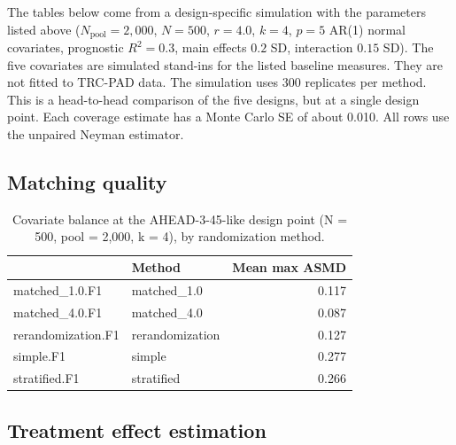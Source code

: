 \documentclass[
  11pt,
]{article}
\begin{document}
The tables below come from a design-specific simulation
with the parameters listed above (\(N_{\text{pool}} =
2{,}000\), \(N = 500\), \(r = 4.0\), \(k = 4\), \(p = 5\) AR(1)
normal covariates, prognostic \(R^2 = 0.3\), main effects
\(0.2\) SD, interaction \(0.15\) SD). The five covariates are
simulated stand-ins for the listed baseline measures. They
are not fitted to TRC-PAD data. The simulation uses
300 replicates per method. This is a head-to-head
comparison of the five designs, but at a single design
point. Each coverage estimate has a Monte Carlo SE of about
0.010. All rows use the unpaired Neyman
estimator.

\subsection{Matching quality}\label{matching-quality}

\begin{table}[!h]
\centering
\caption{\label{tab:application-balance}Covariate balance at the AHEAD-3-45-like design point (N = 500, pool = 2,000, k = 4), by randomization method.}
\centering
\fontsize{10}{12}\selectfont
\begin{tabular}[t]{llr}
\toprule
  & Method & Mean max ASMD\\
\midrule
matched\_1.0.F1 & matched\_1.0 & 0.117\\
matched\_4.0.F1 & matched\_4.0 & 0.087\\
rerandomization.F1 & rerandomization & 0.127\\
simple.F1 & simple & 0.277\\
stratified.F1 & stratified & 0.266\\
\bottomrule
\end{tabular}
\end{table}

\subsection{Treatment effect estimation}\label{treatment-effect-estimation}
\end{document}

